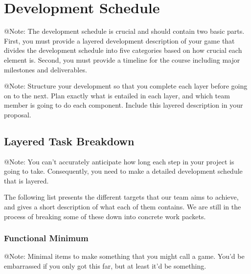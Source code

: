 
\section{Development Schedule}

\begin{TempText}
	@Note: The development schedule is crucial and should contain two basic parts. First, you must provide a layered development description of your game that divides the development schedule into five categories based on how crucial each element is. Second, you must provide a timeline for the course including major milestones and deliverables.
\end{TempText}

\begin{TempText}
	@Note: Structure your development so that you complete each layer before going on to the next. Plan exactly what is entailed in each layer, and which team member is going to do each component. Include this layered description in your proposal.
\end{TempText}

\subsection{Layered Task Breakdown}

\begin{TempText}
	@Note: You can't accurately anticipate how long each step in your project is going to take. Consequently, you need to make a detailed development schedule that is layered.
\end{TempText}

The following list presents the different targets that our team aims to achieve, and gives a short description of what each of them contains. We are still in the process of breaking some of these down into concrete work packets.

\subsubsection{Functional Minimum}

\begin{TempText}
	@Note: Minimal items to make something that you might call a game. You'd be embarrassed if you only got this far, but at least it'd be something.
\end{TempText}

